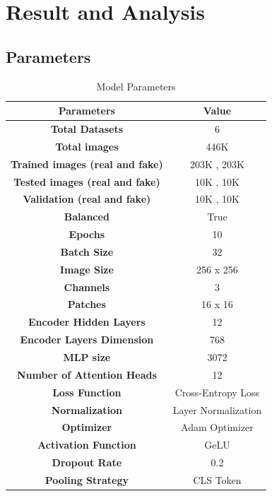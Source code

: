 \section{Result and Analysis}
\subsection{Parameters}
\begin{table}[h]
    \centering
    \renewcommand{\arraystretch}{1.5} %
    \begin{tabular}{|c|c|}
        \hline
        \textbf{Parameters} & \textbf{Value} \\
        \hline
        \textbf{Total Datasets} &  6 \\
        \hline
        \textbf{Total images} & 446K  \\
        \hline
        \textbf{Trained images (real and fake)} & 203K , 203K \\
        \hline
        \textbf{Tested images (real and fake)} & 10K , 10K \\
        \hline
        \textbf{Validation (real and fake)} & 10K , 10K \\
        \hline
        \textbf{Balanced} &  True\\
        \hline
        \textbf{Epochs} &  10\\
        \hline
        \textbf{Batch Size} &  32\\
        \hline
        \textbf{Image Size} &  256 x 256\\
        \hline
        \textbf{Channels} &  3\\
        \hline
        \textbf{Patches} & 16 x 16\\
        \hline
        \textbf{Encoder Hidden Layers} & 12\\
        \hline
        \textbf{Encoder Layers Dimension} & 768\\
        \hline
        \textbf{MLP size} & 3072\\
        \hline
        \textbf{ Number of Attention Heads } & 12\\
        \hline
        \textbf{Loss Function} & Cross-Entropy Loss \\
        \hline
        \textbf{Normalization} & Layer Normalization \\
        \hline
        \textbf{Optimizer} & Adam Optimizer \\
        \hline
        \textbf{Activation Function} & GeLU \\
        \hline
        \textbf{Dropout Rate } & 0.2  \\
        \hline
        \textbf{Pooling Strategy } & CLS Token \\
        \hline
    \end{tabular}
    \caption{Model Parameters}
    \label{tab:model-parameters}
\end{table}
